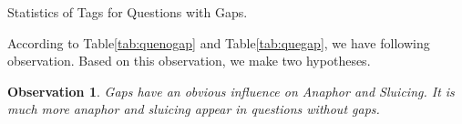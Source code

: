\documentclass[bsc,frontabs,twoside,singlespacing,parskip,deptreport]{infthesis}     %
\newtheorem*{observation}{Observation}
\begin{document}
\begin{minipage}{\textwidth}
\begin{minipage}[t]{0.45\textwidth}
        \end{minipage}
        \begin{minipage}[t]{0.45\textwidth}
        \centering
        \makeatletter{}\makeatother



\caption{Statistics of Tags for Questions with Gaps.}
\label{tab:quegap}


        \end{minipage}
    \end{minipage}


According to Table\ref{tab:quenogap} and Table\ref{tab:quegap}, we have following observation. Based on this observation, we make two hypotheses. 

\begin{observation}
Gaps have an obvious influence on Anaphor and Sluicing. It is much more anaphor and sluicing appear in questions without gaps.
\end{observation}
\end{document}
